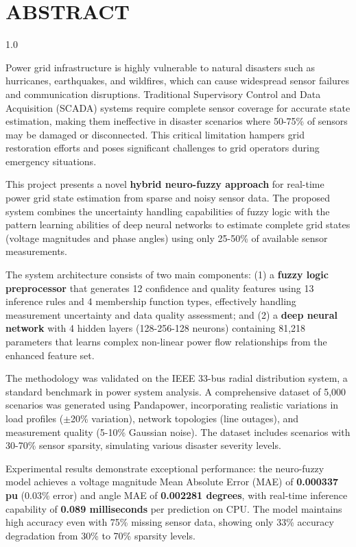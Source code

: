 \documentclass[12pt,a4paper]{report}
\begin{document}
\chapter*{ABSTRACT}
\thispagestyle{empty}
\begin{spacing}{1.0}

Power grid infrastructure is highly vulnerable to natural disasters such as hurricanes, earthquakes, and wildfires, which can cause widespread sensor failures and communication disruptions. Traditional Supervisory Control and Data Acquisition (SCADA) systems require complete sensor coverage for accurate state estimation, making them ineffective in disaster scenarios where 50-75\% of sensors may be damaged or disconnected. This critical limitation hampers grid restoration efforts and poses significant challenges to grid operators during emergency situations.

This project presents a novel \textbf{hybrid neuro-fuzzy approach} for real-time power grid state estimation from sparse and noisy sensor data. The proposed system combines the uncertainty handling capabilities of fuzzy logic with the pattern learning abilities of deep neural networks to estimate complete grid states (voltage magnitudes and phase angles) using only 25-50\% of available sensor measurements.

The system architecture consists of two main components: (1) a \textbf{fuzzy logic preprocessor} that generates 12 confidence and quality features using 13 inference rules and 4 membership function types, effectively handling measurement uncertainty and data quality assessment; and (2) a \textbf{deep neural network} with 4 hidden layers (128-256-128 neurons) containing 81,218 parameters that learns complex non-linear power flow relationships from the enhanced feature set.

The methodology was validated on the IEEE 33-bus radial distribution system, a standard benchmark in power system analysis. A comprehensive dataset of 5,000 scenarios was generated using Pandapower, incorporating realistic variations in load profiles ($\pm$20\% variation), network topologies (line outages), and measurement quality (5-10\% Gaussian noise). The dataset includes scenarios with 30-70\% sensor sparsity, simulating various disaster severity levels.

Experimental results demonstrate exceptional performance: the neuro-fuzzy model achieves a voltage magnitude Mean Absolute Error (MAE) of \textbf{0.000337 pu} (0.03\% error) and angle MAE of \textbf{0.002281 degrees}, with real-time inference capability of \textbf{0.089 milliseconds} per prediction on CPU. The model maintains high accuracy even with 75\% missing sensor data, showing only 33\% accuracy degradation from 30\% to 70\% sparsity levels.


\end{spacing}
\end{document}
